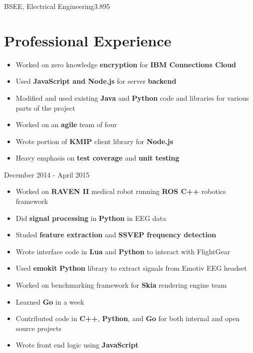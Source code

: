 \documentclass{my_resume}
\begin{document}

	{BSEE, Electrical Engineering}{3.895}

\section{Professional Experience}
\begin{itemize}
	\item Worked on zero knowledge \textbf{encryption} for 
		\textbf{IBM Connections Cloud}
	\item Used \textbf{JavaScript and Node.js} for server \textbf{backend}
	\item Modified and used existing \textbf{Java} and \textbf{Python} code
		and libraries for various parts of the project
	\item Worked on an \textbf{agile} team of four
	\item Wrote portion of \textbf{KMIP} client library for \textbf{Node.js}
    \item Heavy emphasis on \textbf{test coverage} and \textbf{unit testing}
\end{itemize}
	{December 2014 - April 2015}
\begin{itemize}
	\item Worked on \textbf{RAVEN II} medical robot running \textbf{ROS C++}
		robotics framework
	\item Did \textbf{signal processing} in \textbf{Python} in EEG data
	\item Studed \textbf{feature extraction} and \textbf{SSVEP frequency detection}
	\item Wrote interface code in \textbf{Lua} and \textbf{Python} to interact
		with FlightGear
	\item Used \textbf{emokit} \textbf{Python} library to extract signals from
		Emotiv EEG headset
\end{itemize}
\begin{itemize}
	\item Worked on benchmarking framework for \textbf{Skia} rendering engine team
	\item Learned \textbf{Go} in a week
	\item Contributed code in \textbf{C++}, \textbf{Python}, and \textbf{Go} for
		both internal and open source projects
	\item Wrote front end logic using \textbf{JavaScript}
\end{itemize}
\end{document}
